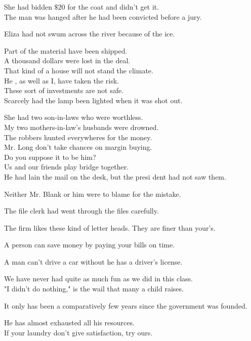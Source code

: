 \documentclass[10pt]{article}
\begin{document}
She had bidden $\$ 20$ for the coat and didn't get it.\\
The man was hanged after he had been convicted before a jury.

Eliza had not swum across the river because of the ice.

Part of the material have been shipped.\\
A thousand dollars were lost in the deal.\\
That kind of a house will not stand the climate.\\
He , as well as I, have taken the risk.\\
These sort of investments are not safe.\\
Scarcely had the lamp been lighted when it was shot out.

She had two son-in-laws who were worthless.\\
My two mothers-in-law's husbands were drowned.\\
The robbers hunted everywheres for the money.\\
Mr. Long don't take chances on margin buying.\\
Do you suppose it to be him?\\
Us and our friends play bridge together.\\
He had lain the mail on the desk, but the presi dent had not saw them.

Neither Mr. Blank or him were to blame for the mistake.

The file clerk had went through the files carefully.

The firm likes these kind of letter heads. They are finer than your's.

A person can save money by paying your bills on time.

A man can't drive a car without he has a driver's license.

We have never had quite as much fun as we did in this class.\\
"I didn't do nothing," is the wail that many a child raises.

It only has been a comparatively few years since the government was founded.

He has almost exhausted all his resources.\\
If your laundry don't give satisfaction, try ours.
\end{document}
